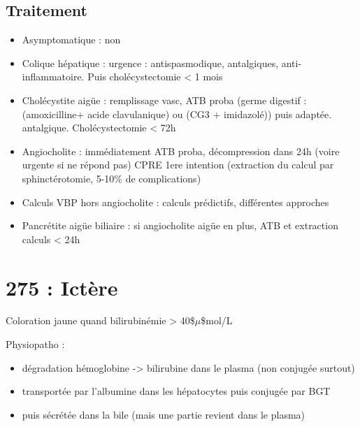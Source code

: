 \documentclass[11pt]{article}
\begin{document}
\subsection{Traitement}
\label{sec:org074ed90}
\begin{itemize}
\item Asymptomatique : non
\item Colique hépatique : \danger urgence : antispasmodique, antalgiques,
anti-inflammatoire. Puis cholécystectomie < 1 mois
\item Cholécystite aigüe : remplissage vasc, ATB proba (germe digestif : (amoxicilline+
acide clavulanique) ou (CG3 + imidazolé)) puis adaptée. antalgique.
Cholécystectomie < 72h
\item Angiocholite : immédiatement ATB proba, décompression dans 24h (voire urgente si
ne répond pas) \thus \gls{CPRE} 1ere intention (extraction du calcul par
sphinctérotomie, 5-10\% de complications)
\item Calculs VBP hors angiocholite : calculs prédictifs, différentes approches
\item Pancrétite aigüe biliaire : si angiocholite aigüe en plus, ATB et extraction
calculs < 24h
\end{itemize}

\section{275 : Ictère}
\label{sec:orge11d20a}
Coloration jaune quand bilirubinémie > 40\$\(\mu\)\$mol/L

Physiopatho : 
\begin{itemize}
\item dégradation hémoglobine -> bilirubine dans le plasma (non conjugée surtout)
\item transportée par l'albumine dans les hépatocytes puis conjugée par \gls{BGT}
\item puis sécrétée dans la bile (mais une partie revient dans le plasma)
\end{itemize}
\end{document}
